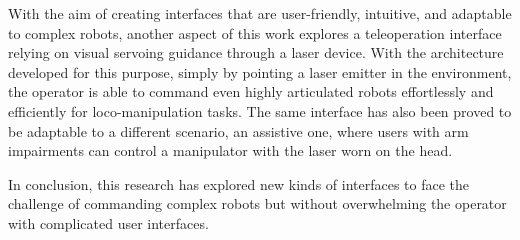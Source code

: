 With the aim of creating interfaces that are user-friendly, intuitive, and adaptable to complex robots, another aspect of this work explores a teleoperation interface relying on visual servoing guidance through a laser device. With the architecture developed for this purpose, simply by pointing a laser emitter in the environment, the operator is able to command even highly articulated robots effortlessly and efficiently for loco-manipulation tasks. The same interface has also been proved to be adaptable to a different scenario, an assistive one, where users with arm impairments can control a manipulator with the laser worn on the head.    

In conclusion, this research has explored new kinds of interfaces to face the challenge of commanding complex robots but without overwhelming the operator with complicated user interfaces.